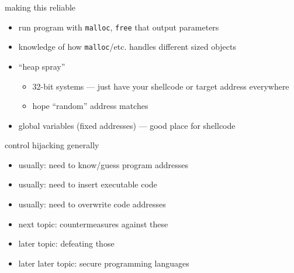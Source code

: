 


\begin{frame}{making this reliable}
    \begin{itemize}
    \item run program with {\tt malloc}, {\tt free} that output parameters
    \item knowledge of how {\tt malloc}/etc. handles different sized objects
    \item ``heap spray'' %
        \begin{itemize} 
        \item 32-bit systems --- just have your shellcode or target address everywhere
        \item hope ``random'' address matches
        \end{itemize}
    \item global variables (fixed addresses) --- good place for shellcode
    \end{itemize}
\end{frame}




\begin{frame}{control hijacking generally}
    \begin{itemize}
    \item usually: need to know/guess program addresses
    \item usually: need to insert executable code
    \item usually: need to overwrite code addresses
    \vspace{.5cm}
    \item next topic: countermeasures against these
    \item later topic: defeating those
    \item later later topic: secure programming languages
    \end{itemize}
\end{frame}

